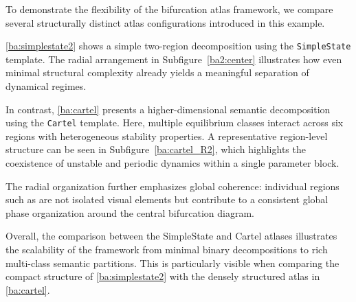 \documentclass{article}
\begin{document}
To demonstrate the flexibility of the bifurcation atlas framework, we compare several structurally distinct atlas configurations introduced in this example.

\ref{ba:simplestate2} shows a simple two-region decomposition using the \texttt{SimpleState} template. The radial arrangement in Subfigure~\ref{ba2:center} illustrates how even minimal structural complexity already yields a meaningful separation of dynamical regimes.

In contrast, \ref{ba:cartel} presents a higher-dimensional semantic decomposition using the \texttt{Cartel} template. Here, multiple equilibrium classes interact across six regions with heterogeneous stability properties. A representative region-level structure can be seen in Subfigure~\ref{ba:cartel_R2}, which highlights the coexistence of unstable and periodic dynamics within a single parameter block.

The radial organization further emphasizes global coherence: individual regions such as  are not isolated visual elements but contribute to a consistent global phase organization around the central bifurcation diagram.

Overall, the comparison between the SimpleState and Cartel atlases illustrates the scalability of the framework from minimal binary decompositions to rich multi-class semantic partitions. This is particularly visible when comparing the compact structure of \ref{ba:simplestate2} with the densely structured atlas in \ref{ba:cartel}.
\end{document}
